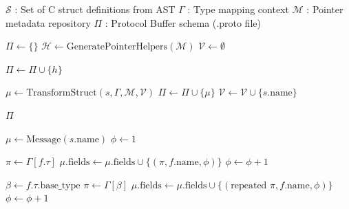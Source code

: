 \begin{algorithm}[H]
\caption{Protocol Buffer Schema Generation from C Structures}
\label{alg:protobuf_schema_generation}
\begin{algorithmic}[1]
\REQUIRE $\mathcal{S}$ : Set of C struct definitions from AST
\REQUIRE $\Gamma$ : Type mapping context
\REQUIRE $\mathcal{M}$ : Pointer metadata repository
\ENSURE $\Pi$ : Protocol Buffer schema (.proto file)

    \STATE $\Pi \leftarrow \{\}$ 
    \STATE $\mathcal{H} \leftarrow \text{GeneratePointerHelpers}(\mathcal{M})$ 
    \STATE $\mathcal{V} \leftarrow \emptyset$ 

    \STATE {}
        \STATE $\Pi \leftarrow \Pi \cup \{h\}$
    \ENDFOR

    \STATE {}
            \STATE $\mu \leftarrow \text{TransformStruct}(s, \Gamma, \mathcal{M}, \mathcal{V})$
            \STATE $\Pi \leftarrow \Pi \cup \{\mu\}$
            \STATE $\mathcal{V} \leftarrow \mathcal{V} \cup \{s.\text{name}\}$
        \ENDIF
    \ENDFOR

    \RETURN $\Pi$
\ENDPROCEDURE

\vspace{0.3cm}

    \STATE $\mu \leftarrow \text{Message}(s.\text{name})$ 
    \STATE $\phi \leftarrow 1$ 

            \STATE $\pi \leftarrow \Gamma[f.\tau]$ 
            \STATE $\mu.\text{fields} \leftarrow \mu.\text{fields} \cup \{(\pi, f.\text{name}, \phi)\}$
            \STATE $\phi \leftarrow \phi + 1$

            \STATE $\beta \leftarrow f.\tau.\text{base\_type}$
            \STATE $\pi \leftarrow \Gamma[\beta]$
            \STATE $\mu.\text{fields} \leftarrow \mu.\text{fields} \cup \{(\text{repeated } \pi, f.\text{name}, \phi)\}$
            \STATE $\phi \leftarrow \phi + 1$


\end{algorithmic}
\end{algorithm}
